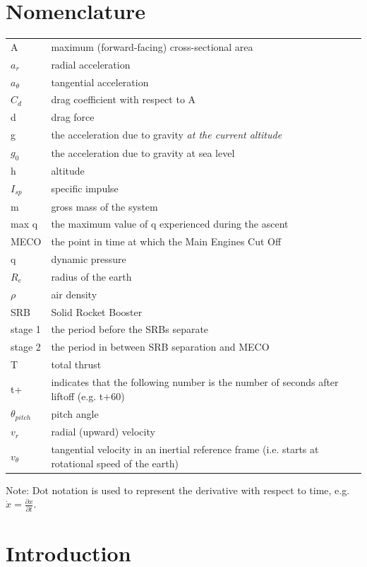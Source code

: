 \documentclass{article}
\begin{document}
\section{Nomenclature}
\begin{tabular}{l l}
A & maximum (forward-facing) cross-sectional area \\
$a_r$ & radial acceleration \\
$a_\theta$ & tangential acceleration \\
$C_d$ & drag coefficient with respect to A \\
d & drag force \\
g & the acceleration due to gravity \it at the current altitude \it \\
$g_0$ & the acceleration due to gravity at sea level \\
h & altitude \\
$I_{sp}$ & specific impulse \\
m & gross mass of the system \\
max q & the maximum value of q experienced during the ascent \\
MECO & the point in time at which the Main Engines Cut Off \\
q & dynamic pressure \\
$R_e$ & radius of the earth \\
$\rho$ & air density \\
SRB & Solid Rocket Booster \\
stage 1 & the period before the SRBs separate \\
stage 2 & the period in between SRB separation and MECO \\
T & total thrust \\
t+ & indicates that the following number is the number of seconds after liftoff (e.g. t+60)\\
$\theta_{pitch}$ & pitch angle \\
$v_r$ & radial (upward) velocity \\
$v_\theta$ & tangential velocity in an inertial reference frame (i.e. starts at rotational speed of the earth)\\
\end{tabular}


Note: Dot notation is used to represent the derivative with respect to time, e.g. $\dot{x} = \frac{\partial x}{\partial t}$.

\section{Introduction}
\end{document}
